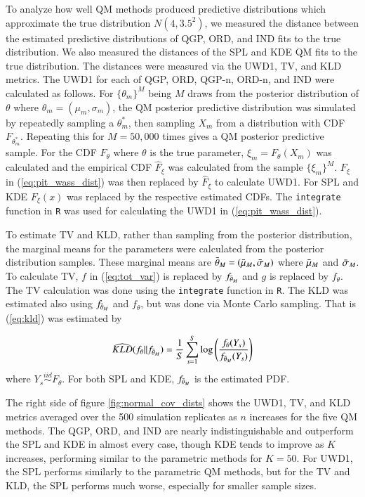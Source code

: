 \documentclass[preprint,12pt,authoryear]{elsarticle}
\begin{document}
To analyze how well QM methods produced predictive distributions which approximate the true distribution $N(4, 3.5^2)$, we measured the distance between the estimated predictive distributions of QGP, ORD, and IND fits to the true distribution. 
We also measured the distances of the SPL and KDE QM fits to the true distribution. The distances were measured via the UWD1, TV, and KLD metrics. 
The UWD1 for each of QGP, ORD, QGP-n, ORD-n, and IND were calculated as follows. For $\{\theta_m\}^M$ being $M$ draws from the posterior distribution of $\theta$ where $\theta_m = (\mu_m, \sigma_m)$, the QM posterior predictive distribution was simulated by repeatedly sampling a $\theta_m^*$, then sampling $X_m$ from a distribution with CDF $F_{\theta_m^*}$. Repeating this for $M = 50,000$ times gives a QM posterior predictive sample. For the CDF $F_{\theta}$ where $\theta$ is the true parameter, $\xi_m = F_{\theta}(X_m)$ was calculated and the empirical CDF $\hat{F}_{\xi}$ was calculated from the sample $\{\xi_m\}^M$. $F_{\xi}$ in (\ref{eq:pit_wass_dist}) was then replaced by $\hat{F}_{\xi}$ to calculate UWD1. For SPL and KDE $F_{\xi}(x)$ was replaced by the respective estimated CDFs. The \texttt{integrate} function in \texttt{R} was used for calculating the UWD1 in (\ref{eq:pit_wass_dist}).

To estimate TV and KLD, rather than sampling from the posterior distribution, the marginal means for the parameters were calculated from the posterior distribution samples. These marginal means  are $\Bar{\theta}_M = (\Bar{\mu}_M, \Bar{\sigma}_M)$ where $\Bar{\mu}_M$ and $\Bar{\sigma}_M$. To calculate TV, $f$ in (\ref{eq:tot_var}) is replaced by $f_{\Bar{\theta}_M}$ and $g$ is replaced by $f_{\theta}$. The TV calculation was done using the \texttt{integrate} function in \texttt{R}. The KLD was estimated also using $f_{\Bar{\theta}_M}$ and $f_{\theta}$, but was done via Monte Carlo sampling. That is (\ref{eq:kld}) was estimated by

\[
    \widehat{KLD}(f_{\theta} || f_{\Bar{\theta}_M}) = \frac{1}{S}\sum_{s = 1}^S \text{log} \left(\frac{f_{\theta}(Y_s)}{f_{\Bar{\theta}_M}(Y_s)}\right)
\]
where $Y_s \overset{iid}{\sim} F_{\theta}$. For both SPL and KDE, $f_{\Bar{\theta}_M}$ is the estimated PDF.


The right side of figure \ref{fig:normal_cov_dists} shows the UWD1, TV, and KLD metrics averaged over the 500 simulation replicates as $n$ increases for the five QM methods. The QGP, ORD, and IND are nearly indistinguishable and outperform the SPL and KDE in almost every case, though KDE tends to improve as $K$ increases, performing similar to the parametric methods for $K = 50$. For UWD1, the SPL performs similarly to the parametric QM methods, but for the TV and KLD, the SPL performs much worse, especially for smaller sample sizes. 
\end{document}
